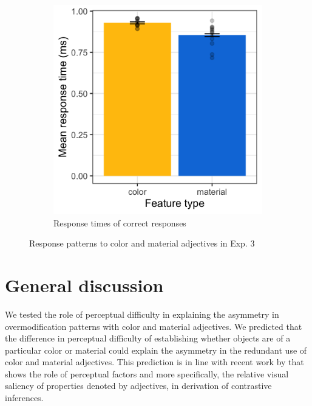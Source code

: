 \documentclass[12pt,letterpaper]{article}
\begin{document}
\begin{figure}[ht]
\begin{subfigure}{.4 \textwidth}
   \includegraphics[width=\textwidth]{plots/exp3_rt.png}
   \caption{Response times of correct responses}
   \label{fig:exp3_b}
   \end{subfigure}
   \caption{Response patterns to color and material adjectives in Exp. 3}
   \label{fig:exp3}
\end{figure}   

\section{General discussion} 

We tested the role of perceptual difficulty in explaining the asymmetry in overmodification patterns with color and material adjectives. We predicted that the difference in perceptual difficulty of establishing whether objects are of a particular color or material could explain the asymmetry in the redundant use of color and material adjectives. This prediction is in line with recent work by \citet{RubioEtAl2019} that shows the role of perceptual factors and more specifically, the relative visual saliency of properties denoted by adjectives, in derivation of contrastive inferences.
\end{document}
